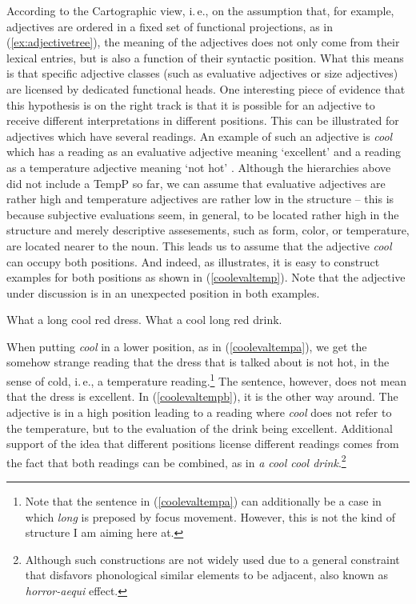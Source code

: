 \noindent According to the Cartographic view, i.\,e., on the assumption that, for example, adjectives are ordered in a fixed set of functional projections, as in (\ref{ex:adjectivetree}), the meaning of the adjectives does not only come from their lexical entries, but is also a function of their syntactic position. What this means is that specific adjective classes (such as evaluative adjectives or size adjectives) are licensed by dedicated functional heads. One interesting piece of evidence that this hypothesis is on the right track is that it is possible for an adjective to receive different interpretations in different positions. This can be illustrated for adjectives which have several readings. An example of such an adjective is \textit{cool} which has a reading as an evaluative adjective meaning `excellent' and a reading as a temperature adjective meaning `not hot' \citep{scott2002stacked}. Although the hierarchies above did not include a TempP so far, we can assume that evaluative adjectives are rather high and temperature adjectives are rather low in the structure -- this is because subjective evaluations seem, in general, to be located rather high in the structure and merely descriptive assesements, such as form, color, or temperature, are located nearer to the noun. This leads us to assume that the adjective \textit{cool} can occupy both positions. And indeed, as \citep[106]{scott2002stacked} illustrates, it is easy to construct examples for both positions as shown in (\ref{coolevaltemp}). Note that the adjective under discussion is in an unexpected position in both examples. 

\begin{exe}
\ex\label{coolevaltemp}\begin{xlist} 
\ex What a long cool red dress. \label{coolevaltempa}
\ex What a cool long red drink. \label{coolevaltempb}
\end{xlist}
\end{exe}

\noindent When putting \textit{cool} in a lower position, as in (\ref{coolevaltempa}), we get the somehow strange reading that the dress that is talked about is not hot, in the sense of cold, i.\,e., a temperature reading.\footnote{ Note that the sentence in (\ref{coolevaltempa}) can additionally be a case in which \textit{long} is preposed by focus movement. However, this is not the kind of structure I am aiming here at.} The sentence, however, does not mean that the dress is excellent. In (\ref{coolevaltempb}), it is the other way around. The adjective is in a high position leading to a reading where \textit{cool} does not refer to the temperature, but to the evaluation of the drink being excellent. Additional support of the idea that different positions license different readings comes from the fact that both readings can be combined, as in \textit{a cool cool drink}.\footnote{ Although such constructions are not widely used due to a general constraint that disfavors phonological similar elements to be adjacent, also known as \textit{horror-aequi} effect.}

